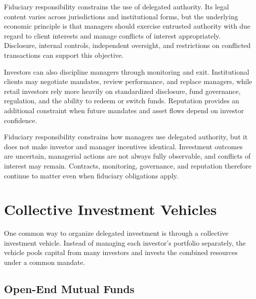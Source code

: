 Fiduciary responsibility constrains the use of delegated authority. Its legal content varies across jurisdictions and institutional forms, but the underlying economic principle is that managers should exercise entrusted authority with due regard to client interests and manage conflicts of interest appropriately. Disclosure, internal controls, independent oversight, and restrictions on conflicted transactions can support this objective.

Investors can also discipline managers through monitoring and exit. Institutional clients may negotiate mandates, review performance, and replace managers, while retail investors rely more heavily on standardized disclosure, fund governance, regulation, and the ability to redeem or switch funds. Reputation provides an additional constraint when future mandates and asset flows depend on investor confidence.

\begin{tcolorbox}[
  enhanced,
  breakable,
  colback=white,
  colframe=FinanceBlue,
  boxrule=0.7pt,
  sharp corners,
  borderline west={2.2pt}{0pt}{FinanceBlue},
  title=\textbf{Financial Perspective: Fiduciary Responsibility Does Not Eliminate Agency Problems},
  coltitle=white,
  colbacktitle=FinanceBlue,
  fonttitle=\bfseries,
  before skip=1.2em,
  after skip=1.2em
]

Fiduciary responsibility constrains how managers use delegated authority, but it does not make investor and manager incentives identical. Investment outcomes are uncertain, managerial actions are not always fully observable, and conflicts of interest may remain. Contracts, monitoring, governance, and reputation therefore continue to matter even when fiduciary obligations apply.

\end{tcolorbox}

\section{Collective Investment Vehicles}

One common way to organize delegated investment is through a collective investment vehicle. Instead of managing each investor's portfolio separately, the vehicle pools capital from many investors and invests the combined resources under a common mandate.

\subsection{Open-End Mutual Funds}


